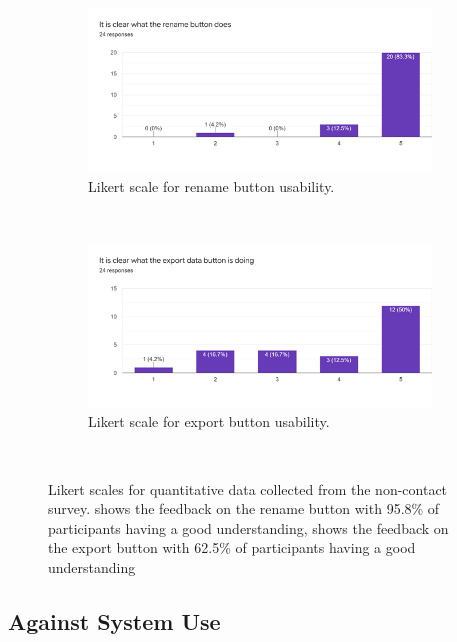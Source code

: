\documentclass{l4proj}
\begin{document}
\begin{figure}[!htb]
    \centering
    \begin{subfigure}[b]{0.48\textwidth}
        \includegraphics[width=\textwidth]{images/rename_likert.png}
        \caption{ Likert scale for rename button usability. }
        \label{fig:rename_likert}
    \end{subfigure}
    ~
    \begin{subfigure}[b]{0.48\textwidth}
        \includegraphics[width=\textwidth]{images/export_likert.png}
        \caption{ Likert scale for export button usability. }
        \label{fig:export_likert}
    \end{subfigure}
    ~
    \caption{ Likert scales for quantitative data collected from the non-contact survey.  shows the feedback on the rename button with 95.8\% of participants having a good understanding,  shows the feedback on the export button with 62.5\% of participants having a good understanding }
    \label{fig:button_likert}
\end{figure}

\subsection{Against System Use}
\end{document}
